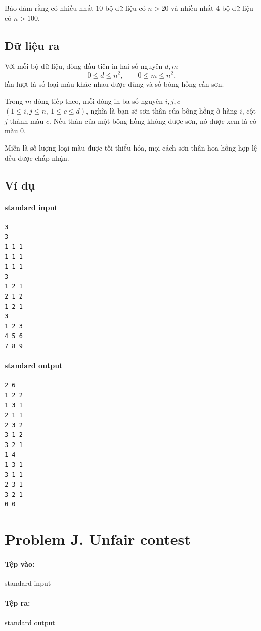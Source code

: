 \documentclass[11pt]{article}
\begin{document}
Bảo đảm rằng có nhiều nhất \(10\) bộ dữ liệu có \(n>20\) và nhiều nhất \(4\)
bộ dữ liệu có \(n>100\).

\subsection*{Dữ liệu ra}

Với mỗi bộ dữ liệu, dòng đầu tiên in hai số nguyên \(d,m\)
\[
  0\le d\le n^2,\qquad 0\le m\le n^2,
\]
lần lượt là số loại màu khác nhau được dùng và số bông hồng cần sơn.

Trong \(m\) dòng tiếp theo, mỗi dòng in ba số nguyên \(i,j,c\)
\((1\le i,j\le n,\ 1\le c\le d)\), nghĩa là bạn sẽ sơn thân của bông hồng ở
hàng \(i\), cột \(j\) thành màu \(c\). Nếu thân của một bông hồng không được
sơn, nó được xem là có màu \(0\).

Miễn là số lượng loại màu được tối thiểu hóa, mọi cách sơn thân hoa hồng hợp
lệ đều được chấp nhận.

\subsection*{Ví dụ}

\paragraph{standard input}
\begin{verbatim}
3
3
1 1 1
1 1 1
1 1 1
3
1 2 1
2 1 2
1 2 1
3
1 2 3
4 5 6
7 8 9
\end{verbatim}

\paragraph{standard output}
\begin{verbatim}
2 6
1 2 2
1 3 1
2 1 1
2 3 2
3 1 2
3 2 1
1 4
1 3 1
3 1 1
2 3 1
3 2 1
0 0
\end{verbatim}

\section{Problem J. Unfair contest}

\paragraph{Tệp vào:} standard input
\paragraph{Tệp ra:} standard output
\end{document}
